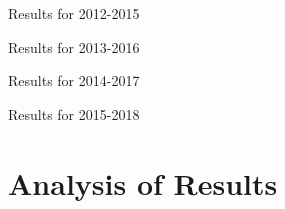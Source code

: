 \documentclass{beamer}
\begin{document}
\begin{frame}{Results for 2012-2015}
    \begin{table}[h]
        \centering
        \caption{Results for 2012–2015}
        \label{tab:results_2012-07-31_2015-12-31}
    \end{table}
\end{frame}

\begin{frame}{Results for 2013-2016}
    \begin{table}[h]
        \centering
        \caption{Results for 2013–2016}
        \label{tab:results_2013-01-31_2016-12-31}
    \end{table}
\end{frame}

\begin{frame}{Results for 2014-2017}
    \begin{table}[h]
        \centering
        \caption{Results for 2014–2017}
        \label{tab:results_2014-01-31_2017-12-31}
    \end{table}
\end{frame}

\begin{frame}{Results for 2015-2018}
    \begin{table}[h]
        \centering
        \caption{Results for 2015–2018}
        \label{tab:results_2015-01-31_2018-12-31}
    \end{table}
\end{frame}

\section{Analysis of Results}
\end{document}
